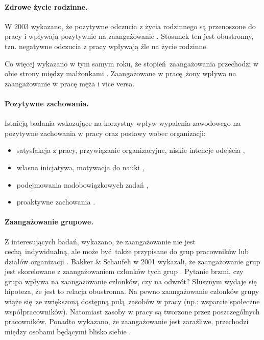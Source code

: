 \paragraph{Zdrowe życie rodzinne.}
W 2003 wykazano, że pozytywne odczucia z życia rodzinnego są przenoszone do pracy i wpływają pozytywnie na zaangażowanie \citep{montgomery2003work}. Stosunek ten jest obustronny, tzn. negatywne odczucia z pracy wpływają źle na życie rodzinne. 

Co więcej wykazano w tym samym roku, że stopień zaangażowania przechodzi w obie strony między małżonkami \citep{bakker2003crossover}. Zaangażowane w pracę żony wpływa na zaangażowanie w pracę męża i vice versa.
\paragraph{Pozytywne zachowania.}
Istnieją badania wskazujące na korzystny wpływ wypalenia zawodowego na pozytywne zachowania w pracy oraz postawy wobec organizacji:
\begin{itemize}
  \item satysfakcja z pracy, przywiązanie organizacyjne, niskie intencje odejścia \citep{demerouti2001job,salanova2000burnout,schaufeli2008workaholism},
  \item własna inicjatywa, motywacja do nauki \citep{sonnentag2003recovery},
  \item podejmowania nadobowiązkowych zadań \citep{salanova2005linking},
  \item proaktywne zachowania \citep{salanova2003perceived}.
\end{itemize}
\paragraph{Zaangażowanie grupowe.}
Z interesujących badań, wykazano, że zaangażowanie nie jest cechą indywidualną, ale może być także przypisane do grup pracowników lub działów organizacji \citep{salanova2005linking,bakker2003multigroup}. Bakker \& Schaufeli w 2001 wykazali, że zaangażowanie grup jest skorelowane z zaangażowaniem członków tych grup \citep{bakker2001burnout}. Pytanie brzmi, czy grupa wpływa na zaangażowanie członków, czy na odwrót? Słusznym wydaje się hipoteza, że jest to relacja
obustronna. Na pewno zaangażowanie członków grupy wiąże się ze zwiększoną dostępną pulą zasobów w pracy (np.: wsparcie społeczne współpracowników). Natomiast zasoby w pracy są tworzone przez poszczególnych pracowników. Ponadto wykazano, że zaangażowanie jest zaraźliwe, przechodzi między osobami będącymi blisko siebie \citep{bakker2003crossover}.

